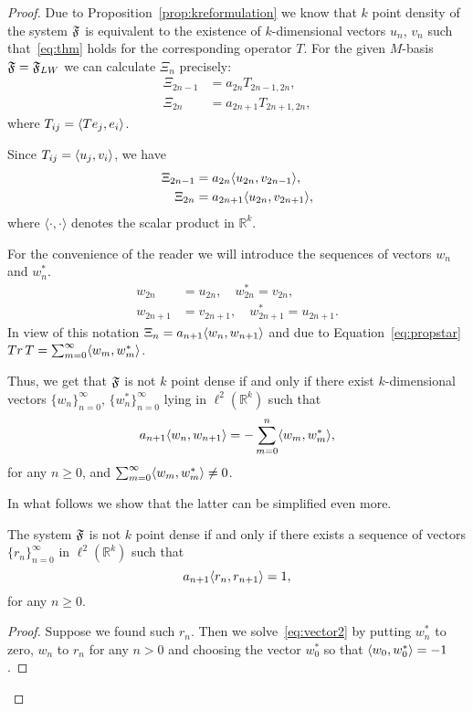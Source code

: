   \begin{proof}
    Due to Proposition~\ref{prop:kreformulation} we know that $k$ point density of the system $\mathfrak{F}$ is equivalent to the existence of $k$-dimensional
      vectors $u_n$, $v_n$ such that~\eqref{eq:thm} holds for the corresponding operator $T$.
    For the given $M$-basis $\mathfrak{F} = \mathfrak{F}_{LW}$ we can calculate $\Xi_n$ precisely:
    \begin{align*}
      \Xi_{2n-1} &= a_{2n}T_{2n - 1, 2n},\\
      \Xi_{2n} &= a_{2n + 1}T_{2n + 1, 2n},
    \end{align*}
      where $T_{ij} = \langle Te_j, e_i \rangle$.

    Since $T_{ij} = \langle u_j, v_i \rangle$, we have
    \begin{align*}
      \Xi_{2n-1} &= a_{2n}   \langle u_{2n}, v_{2n-1} \rangle,\\
      \Xi_{2n}   &= a_{2n+1} \langle u_{2n}, v_{2n+1} \rangle,
    \end{align*}
      where $\langle\cdot, \cdot\rangle$ denotes the scalar product in $\mathbb{R}^k$.

    For the convenience of the reader we will introduce the sequences of vectors $w_n$ and $w^*_n$.
    \begin{align*}
      w_{2n} &= u_{2n}, \quad w^*_{2n} = v_{2n},\\
      w_{2n+1} &= v_{2n+1}, \quad w^*_{2n+1} = u_{2n+1}.
    \end{align*}
    In view of this notation $\Xi_n = a_{n+1} \langle w_n, w_{n+1} \rangle$ and due to Equation~\eqref{eq:propstar}
      $Tr\, T = \sum_{m=0}^\infty \langle w_m, w^*_m \rangle$.

    Thus, we get that $\mathfrak{F}$ is not $k$ point dense if and only if there exist
      $k$-dimensional vectors $\{w_n\}_{n=0}^\infty$, $\{w^*_n\}_{n=0}^\infty$ lying in $\ell^2(\mathbb{R}^k)$ such that
    \begin{equation}
      \label{eq:vector2}
      a_{n+1} \langle w_n, w_{n+1} \rangle = -\sum_{m=0}^n \langle w_m, w^*_m \rangle,
    \end{equation}
      for any $n \geq 0$, and $\sum_{m=0}^\infty \langle w_m, w^*_m \rangle \neq 0$.

    \medskip
    In what follows we show that the latter can be simplified even more.
    \begin{prop}
      \label{prop:reformulation-lw}
      The system $\mathfrak{F}$ is not $k$ point dense if and only if there exists a sequence of vectors
        $\{r_n\}_{n=0}^\infty$ in $\ell^2(\mathbb{R}^k)$ such that
      \begin{equation}
        \label{eq:vector3}
        a_{n+1} \langle r_n, r_{n+1} \rangle = 1,
      \end{equation}
        for any $n \geq 0$.
    \end{prop}
    \begin{proof}
      Suppose we found such $r_n$.
      Then we solve~\eqref{eq:vector2} by putting $w^*_n$ to zero, $w_n$ to $r_n$ for any $n > 0$ and
        choosing the vector $w^*_0$ so that $\langle w_0, w^*_0 \rangle = -1$.


\end{proof}
\end{proof}

